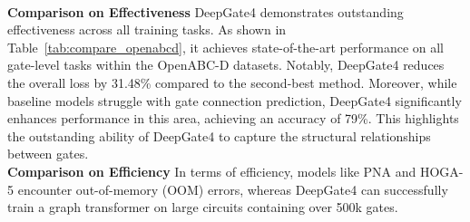 {\vspace{3pt} \\
\noindent\textbf{Comparison on Effectiveness}
DeepGate4 demonstrates outstanding effectiveness across all training tasks. As shown in Table~\ref{tab:compare_openabcd}, it achieves state-of-the-art performance on all gate-level tasks within the OpenABC-D datasets. Notably, DeepGate4 reduces the overall loss by 31.48\% compared to the second-best method. Moreover, while baseline models struggle with gate connection prediction, DeepGate4 significantly enhances performance in this area, achieving an accuracy of 79\%. This highlights the outstanding ability of DeepGate4 to capture the structural relationships between gates.
\vspace{3pt} \\
\noindent\textbf{Comparison on Efficiency}
In terms of efficiency, models like PNA and HOGA-5 encounter out-of-memory (OOM) errors, whereas DeepGate4 can successfully train a graph transformer on large circuits containing over 500k gates. 
}


